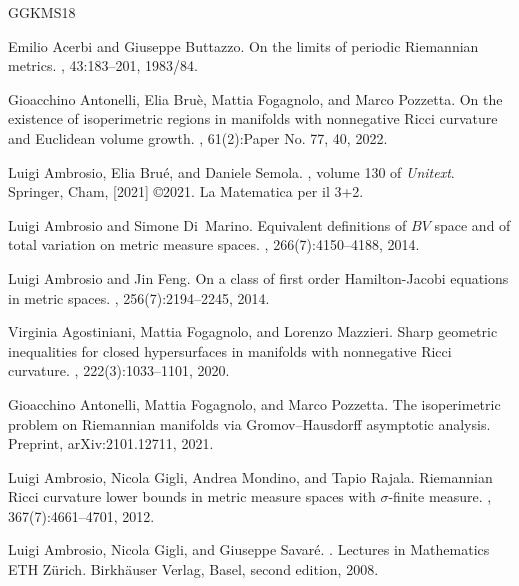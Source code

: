 \documentclass[11pt]{article}
\numberwithin{equation}{section}
\begin{document}
{\small
\def\cprime{$'$} \def\cprime{$'$}
\begin{thebibliography}{GGKMS18}

Emilio Acerbi and Giuseppe Buttazzo.
\newblock On the limits of periodic {R}iemannian metrics.
, 43:183--201, 1983/84.

Gioacchino Antonelli, Elia Bru\`e, Mattia Fogagnolo, and Marco Pozzetta.
\newblock On the existence of isoperimetric regions in manifolds with
  nonnegative {R}icci curvature and {E}uclidean volume growth.
, 61(2):Paper No. 77,
  40, 2022.

Luigi Ambrosio, Elia Bru\'{e}, and Daniele Semola.
, volume 130 of {\em Unitext}.
\newblock Springer, Cham, [2021] \copyright 2021.
\newblock La Matematica per il 3+2.

Luigi Ambrosio and Simone Di~Marino.
\newblock Equivalent definitions of {$BV$} space and of total variation on
  metric measure spaces.
, 266(7):4150--4188, 2014.

Luigi Ambrosio and Jin Feng.
\newblock On a class of first order {H}amilton-{J}acobi equations in metric
  spaces.
, 256(7):2194--2245, 2014.

Virginia Agostiniani, Mattia Fogagnolo, and Lorenzo Mazzieri.
\newblock Sharp geometric inequalities for closed hypersurfaces in manifolds
  with nonnegative {R}icci curvature.
, 222(3):1033--1101, 2020.

Gioacchino Antonelli, Mattia Fogagnolo, and Marco Pozzetta.
\newblock The isoperimetric problem on {R}iemannian manifolds via
  {G}romov--{H}ausdorff asymptotic analysis.
\newblock Preprint, arXiv:2101.12711, 2021.

Luigi Ambrosio, Nicola Gigli, Andrea Mondino, and Tapio Rajala.
\newblock Riemannian {R}icci curvature lower bounds in metric measure spaces
  with $\sigma$-finite measure.
, 367(7):4661--4701, 2012.

Luigi Ambrosio, Nicola Gigli, and Giuseppe Savar{\'e}.
.
\newblock Lectures in Mathematics ETH Z\"urich. Birkh\"auser Verlag, Basel,
  second edition, 2008.


\end{thebibliography}}
\end{document}
